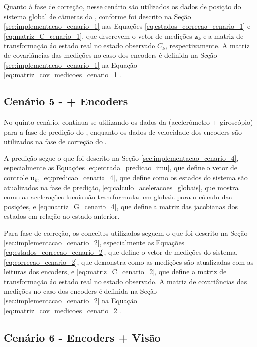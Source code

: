 \documentclass[acronym, symbols, table]{fei}
\begin{document}
			 Quanto à fase de correção, nesse cenário são utilizados os dados de posição do sistema global de câmeras da , conforme foi descrito na Seção \ref{sec:implementacao_cenario_1} nas Equações \ref{eq:estados_correcao_cenario_1} e \ref{eq:matriz_C_cenario_1}, que descrevem o vetor de medições $\textbf{z}_{k}$ e a matriz de transformação do estado real no estado observado $C_{k}$, respectivamente. A matriz de covariâncias das medições no caso dos encoders é definida na Seção \ref{sec:implementacao_cenario_1} na Equação \ref{eq:matriz_cov_medicoes_cenario_1}.
		
		\subsection{Cenário 5 -  + Encoders} \label{sec:implementacao_cenario_5}
			
			No quinto cenário, continua-se utilizando os dados da  (acelerômetro + giroscópio) para a fase de predição do , enquanto os dados de velocidade dos encoders são utilizados na fase de correção do .
			
			A predição segue o que foi descrito na Seção \ref{sec:implementacao_cenario_4}, especialmente as Equações \ref{eq:entrada_predicao_imu}, que define o vetor de controle $\textbf{u}_k$, \ref{eq:predicao_cenario_4}, que define como os estados do sistema são atualizados na fase de predição, \ref{eq:calculo_aceleracoes_globais}, que mostra como as acelerações locais são transformadas em globais para o cálculo das posições, e \ref{eq:matriz_G_cenario_4}, que define a matriz das jacobianas dos estados em relação ao estado anterior.
	
			Para fase de correção, os conceitos utilizados seguem o que foi descrito na Seção \ref{sec:implementacao_cenario_2}, especialmente as Equações \ref{eq:estados_correcao_cenario_2}, que define o vetor de medições do sistema, \ref{eq:correcao_cenario_2}, que demonstra como as medições são atualizadas com as leituras dos encoders, e \ref{eq:matriz_C_cenario_2}, que define a matriz de transformação do estado real no estado observado. A matriz de covariâncias das medições no caso dos encoders é definida na Seção \ref{sec:implementacao_cenario_2} na Equação \ref{eq:matriz_cov_medicoes_cenario_2}.
			
		\subsection{Cenário 6 - Encoders + Visão} \label{sec:implementacao_cenario_6}
			
\end{document}
